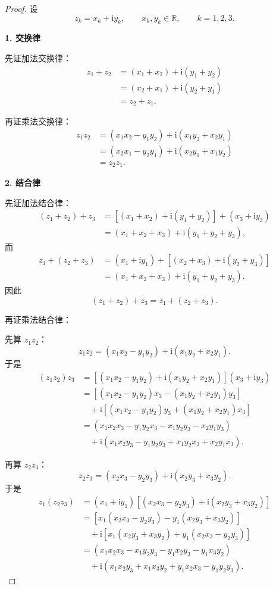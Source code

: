 \begin{proof}
设
\[
z_k=x_k+\mathrm{i}y_k,\qquad x_k,y_k\in\mathbb{R},\qquad k=1,2,3.
\]

\noindent\textbf{1. 交换律}

先证加法交换律：
\begin{align*}
    z_1+z_2
    &=(x_1+x_2)+\mathrm{i}(y_1+y_2)\\
    &=(x_2+x_1)+\mathrm{i}(y_2+y_1)\\
    &=z_2+z_1.
\end{align*}

\noindent 再证乘法交换律：
\begin{align*}
    z_1z_2
    &=(x_1x_2-y_1y_2)+\mathrm{i}(x_1y_2+x_2y_1)\\
    &=(x_2x_1-y_2y_1)+\mathrm{i}(x_2y_1+x_1y_2)\\
    &=z_2z_1.
\end{align*}

\noindent\textbf{2. 结合律}

先证加法结合律：
\begin{align*}
    (z_1+z_2)+z_3
    &=[(x_1+x_2)+\mathrm{i}(y_1+y_2)]+(x_3+\mathrm{i}y_3)\\
    &=(x_1+x_2+x_3)+\mathrm{i}(y_1+y_2+y_3),
\end{align*}
而
\begin{align*}
    z_1+(z_2+z_3)
    &=(x_1+\mathrm{i}y_1)+[(x_2+x_3)+\mathrm{i}(y_2+y_3)]\\
    &=(x_1+x_2+x_3)+\mathrm{i}(y_1+y_2+y_3).
\end{align*}
因此
\[
    (z_1+z_2)+z_3=z_1+(z_2+z_3).
\]

\noindent 再证乘法结合律：

先算 $z_1z_2$：
\[
z_1z_2=(x_1x_2-y_1y_2)+\mathrm{i}(x_1y_2+x_2y_1).
\]
于是
\begin{align*}
    (z_1z_2)z_3
    &=[(x_1x_2-y_1y_2)+\mathrm{i}(x_1y_2+x_2y_1)](x_3+\mathrm{i}y_3)\\
    &=[(x_1x_2-y_1y_2)x_3-(x_1y_2+x_2y_1)y_3]\\
    &\quad+\mathrm{i}[(x_1x_2-y_1y_2)y_3+(x_1y_2+x_2y_1)x_3]\\
    &=(x_1x_2x_3-y_1y_2x_3-x_1y_2y_3-x_2y_1y_3)\\
    &\quad+\mathrm{i}(x_1x_2y_3-y_1y_2y_3+x_1y_2x_3+x_2y_1x_3).
\end{align*}

再算 $z_2z_3$：
\[
z_2z_3=(x_2x_3-y_2y_3)+\mathrm{i}(x_2y_3+x_3y_2).
\]
于是
\begin{align*}
    z_1(z_2z_3)
    &=(x_1+\mathrm{i}y_1)[(x_2x_3-y_2y_3)+\mathrm{i}(x_2y_3+x_3y_2)]\\
    &=[x_1(x_2x_3-y_2y_3)-y_1(x_2y_3+x_3y_2)]\\
    &\quad+\mathrm{i}[x_1(x_2y_3+x_3y_2)+y_1(x_2x_3-y_2y_3)]\\
    &=(x_1x_2x_3-x_1y_2y_3-y_1x_2y_3-y_1x_3y_2)\\
    &\quad+\mathrm{i}(x_1x_2y_3+x_1x_3y_2+y_1x_2x_3-y_1y_2y_3).
\end{align*}


\end{proof}
